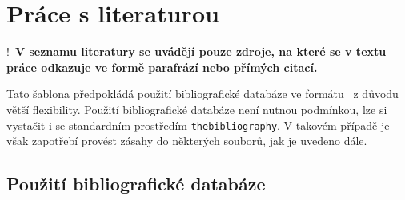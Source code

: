 
\chapter{Práce s literaturou}

\lettrine[lines=2]{!}{~}\textbf{V seznamu literatury se uvádějí pouze zdroje, na které se v textu práce odkazuje ve formě parafrází nebo přímých citací.}

Tato šablona předpokládá použití bibliografické databáze ve formátu \BibTeX\ z důvodu větší flexibility. Použití bibliografické databáze není nutnou podmínkou, lze si vystačit i se standardním prostředím \texttt{thebibliography}. V takovém případě je však zapotřebí provést zásahy do některých souborů, jak je uvedeno dále.

\section{Použití bibliografické databáze}


